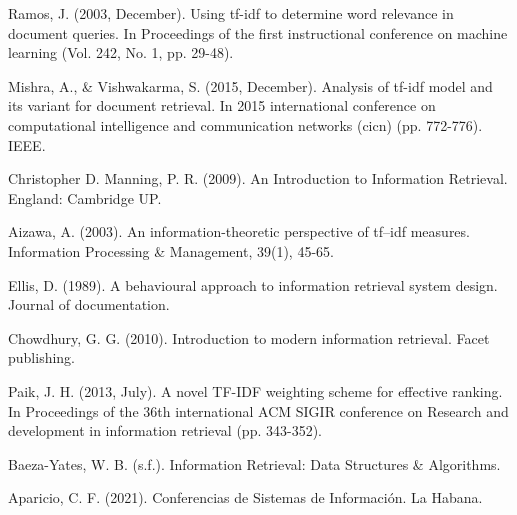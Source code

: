 \documentclass{llncs}
\begin{document}
\tableofcontents
\clearpage














%
%
\begin{thebibliography}{}
%

Ramos, J. (2003, December). Using tf-idf to determine word relevance in
document queries. In Proceedings of the first instructional conference on
machine learning (Vol. 242, No. 1, pp. 29-48).

\bibitem{}
Mishra, A., \& Vishwakarma, S. (2015, December). Analysis of tf-idf model and
its variant for document retrieval. In 2015 international conference on
computational intelligence and communication networks (cicn) (pp. 772-776). IEEE.

\bibitem{}
Christopher D. Manning, P. R. (2009). An Introduction to Information Retrieval.
England: Cambridge UP.

\bibitem{}
Aizawa, A. (2003). An information-theoretic perspective of tf–idf measures.
Information Processing \& Management, 39(1), 45-65.

\bibitem{}
Ellis, D. (1989). A behavioural approach to information retrieval system
design. Journal of documentation.

\bibitem{}
Chowdhury, G. G. (2010). Introduction to modern information retrieval.
Facet publishing.

\bibitem{}
Paik, J. H. (2013, July). A novel TF-IDF weighting scheme for effective
ranking. In Proceedings of the 36th international ACM SIGIR conference on
Research and development in information retrieval (pp. 343-352).

\bibitem{}
Baeza-Yates, W. B. (s.f.). Information Retrieval: Data Structures \&
Algorithms.

\bibitem{}
Aparicio, C. F. (2021). Conferencias de Sistemas de Información. La Habana.


\end{thebibliography}
\clearpage
{} %
\renewcommand{\indexname}{Subject Index}

\end{document}
